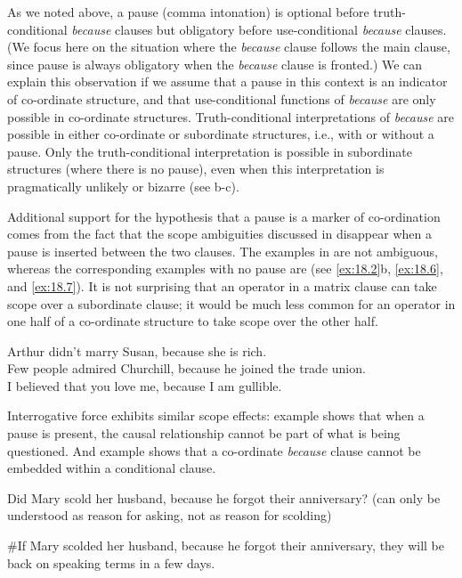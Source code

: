 As we noted above, a pause (comma intonation) is optional before truth-conditional \textit{because} clauses but obligatory before use-conditional \textit{because} clauses. (We focus here on the situation where the \textit{because} clause follows the main clause, since pause is always obligatory when the \textit{because} clause is fronted.) We can explain this observation if we assume that a pause in this context is an indicator of co-ordinate structure, and that use-conditional functions of \textit{because} are only possible in co-ordinate structures. Truth-conditional interpretations of \textit{because} are possible in either co-ordinate or subordinate structures, i.e., with or without a pause. Only the truth-conditional interpretation is possible in subordinate structures (where there is no pause), even when this interpretation is pragmatically unlikely or bizarre (see b-c).



Additional support for the hypothesis that a pause is a marker of co-ordination comes from the fact that the scope ambiguities discussed in  disappear when a pause is inserted between the two clauses. The examples in  are not ambiguous, whereas the corresponding examples with no pause are (see \ref{ex:18.2}b, \ref{ex:18.6}, and \ref{ex:18.7}). It is not surprising that an operator in a matrix clause can take scope over a subordinate clause; it would be much less common for an operator in one half of a co-ordinate structure to take scope over the other half.


\ea \label{ex:18.21}
\ea  Arthur didn’t marry Susan, because she is rich.\\
\ex Few people admired Churchill, because he joined the trade union.\\
\ex I believed that you love me, because I am gullible.
                       \z
\z


Interrogative force exhibits similar scope effects: example  shows that when a pause is present, the causal relationship cannot be part of what is being questioned. And example  shows that a co-ordinate \textit{because} clause cannot be embedded within a conditional clause.


\ea \label{ex:18.22}
Did Mary scold her husband, because he forgot their anniversary? (can only be understood as reason for asking, not as reason for scolding)
\z

\ea \label{ex:18.23}
\#If Mary scolded her husband, because he forgot their anniversary, they will be back on speaking terms in a few days.
\z


